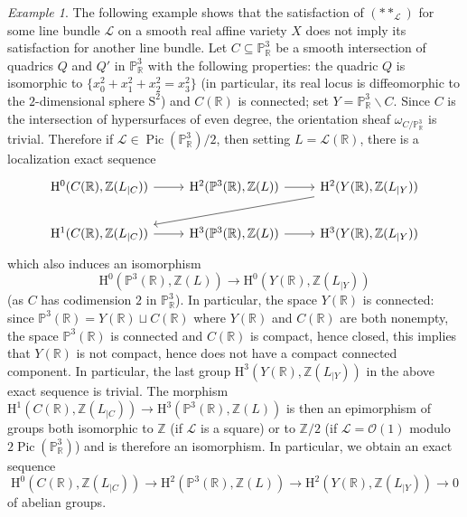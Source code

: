 \documentclass[11pt,leqno]{amsart}
\newcommand{\Osc}{{\mathscr{O}}}
\renewcommand{\1}{{\rm 1\hspace*{-0.4ex}%
\rule{0.1ex}{1.52ex}\hspace*{0.2ex}}}
\renewcommand{\Lc}{{\mathcal L}}
\newcommand{\Pic}{\operatorname{Pic}}
\newcommand{\Hr}{{\mathrm {H}}}
\newcommand{\<}[1]{{\langle}#1 {\rangle}}
\newcommand{\Rb}{\mathbb{R}}
\newcommand{\Zb}{\mathbb{Z}}
\newcommand{\Sr}{\mathrm{S}}
\renewcommand{\setminus}{\smallsetminus}
\theoremstyle{plain}
\theoremstyle{definition}
\theoremstyle{remark}
\newtheorem{ex}[thm]{Example}
\numberwithin{equation}{section}
\begin{document}
\begin{ex}\label{exe:different_satisfaction_double_star}
The following example shows that the satisfaction of $(**_\Lc)$ for some line bundle $\Lc$ on a smooth real affine variety $X$ does not imply its satisfaction for another line bundle. Let $C\subseteq\mathbb{P}_\Rb^3$ be a smooth intersection of quadrics $Q$ and $Q'$ in $\mathbb{P}_\Rb^3$ with the following properties: the quadric $Q$ is isomorphic to $\{x_0^2+x_1^2+x_2^2=x_3^2\}$ (in particular, its real locus is diffeomorphic to the $2$-dimensional sphere $\Sr^2$) and $C(\Rb)$ is connected; set $Y=\mathbb{P}_\Rb^3\setminus C$. Since $C$ is the intersection of hypersurfaces of even degree, the orientation sheaf $\omega_{C/\mathbb{P}_\Rb^3}$ is trivial. Therefore if $\Lc\in\Pic(\mathbb{P}_\Rb^3)/2$, then setting $L=\Lc(\Rb)$, there is a localization exact sequence 
\[\begin{tikzcd}
	{\Hr^0(C(\Rb),\Zb(L_{|C}))} & {\Hr^2(\mathbb{P}^3(\Rb),\Zb(L))} & {\Hr^2(Y(\Rb),\Zb(L_{|Y}))} \\
	{\Hr^1(C(\Rb),\Zb(L_{|C}))} & {\Hr^3(\mathbb{P}^3(\Rb),\Zb(L))} & {\Hr^3(Y(\Rb),\Zb(L_{|Y}))}
	\arrow[from=1-1, to=1-2]
	\arrow[from=1-2, to=1-3]
	\arrow[from=1-3, to=2-1]
	\arrow[from=2-1, to=2-2]
	\arrow[from=2-2, to=2-3]
\end{tikzcd}\]
which also induces an isomorphism \[\Hr^0(\mathbb{P}^3(\Rb),\Zb(L))\to\Hr^0(Y(\Rb),\Zb(L_{|Y}))\] (as $C$ has codimension $2$ in $\mathbb{P}_\Rb^3$). In particular, the space $Y(\Rb)$ is connected: since $\mathbb{P}^3(\Rb)=Y(\Rb)\sqcup C(\Rb)$ where $Y(\Rb)$ and $C(\Rb)$ are both nonempty, the space $\mathbb{P}^3(\Rb)$ is connected and $C(\Rb)$ is compact, hence closed, this implies that $Y(\Rb)$ is not compact, hence does not have a compact connected component. In particular, the last group $\Hr^3(Y(\Rb),\Zb(L_{|Y}))$ in the above exact sequence is trivial. The morphism $\Hr^1(C(\Rb),\Zb(L_{|C}))\to\Hr^3(\mathbb{P}^3(\Rb),\Zb(L))$ is then an epimorphism of groups both isomorphic to $\Zb$ (if $\Lc$ is a square) or to $\Zb/2$ (if $\Lc=\Osc(1)$ modulo $2\Pic(\mathbb{P}_\Rb^3)$) and is therefore an isomorphism. In particular, we obtain an exact sequence \[\Hr^0(C(\Rb),\Zb(L_{|C}))\to\Hr^2(\mathbb{P}^3(\Rb),\Zb(L))\to\Hr^2(Y(\Rb),\Zb(L_{|Y}))\to 0\] of abelian groups.


\end{ex}
\end{document}
